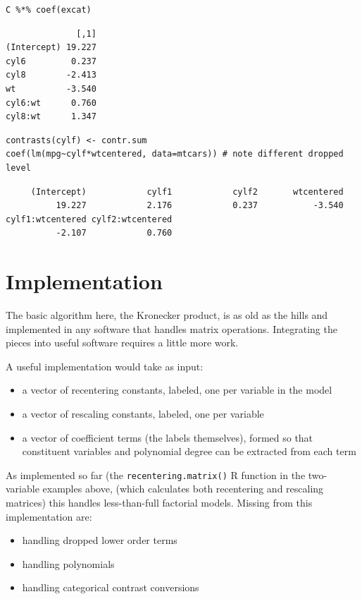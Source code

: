 \documentclass[]{article}
\providecommand{\tightlist}{%
  \setlength{\itemsep}{0pt}\setlength{\parskip}{0pt}}
\begin{document}
\begin{verbatim}
C %*% coef(excat)
\end{verbatim}

\begin{verbatim}
              [,1]
(Intercept) 19.227
cyl6         0.237
cyl8        -2.413
wt          -3.540
cyl6:wt      0.760
cyl8:wt      1.347
\end{verbatim}

\begin{verbatim}
contrasts(cylf) <- contr.sum
coef(lm(mpg~cylf*wtcentered, data=mtcars)) # note different dropped level
\end{verbatim}

\begin{verbatim}
     (Intercept)            cylf1            cylf2       wtcentered 
          19.227            2.176            0.237           -3.540 
cylf1:wtcentered cylf2:wtcentered 
          -2.107            0.760 
\end{verbatim}

\hypertarget{implementation}{%
\section{Implementation}\label{implementation}}

The basic algorithm here, the Kronecker product, is as old as the hills
and implemented in any software that handles matrix operations.
Integrating the pieces into useful software requires a little more work.

A useful implementation would take as input:

\begin{itemize}
\tightlist
\item
  a vector of recentering constants, labeled, one per variable in the
  model
\item
  a vector of rescaling constants, labeled, one per variable
\item
  a vector of coefficient terms (the labels themselves), formed so that
  constituent variables and polynomial degree can be extracted from each
  term
\end{itemize}

As implemented so far (the \texttt{recentering.matrix()} R function in
the two-variable examples above, (which calculates both recentering and
rescaling matrices) this handles less-than-full factorial models.
Missing from this implementation are:

\begin{itemize}
\tightlist
\item
  handling dropped lower order terms
\item
  handling polynomials
\item
  handling categorical contrast conversions
\end{itemize}
\end{document}
